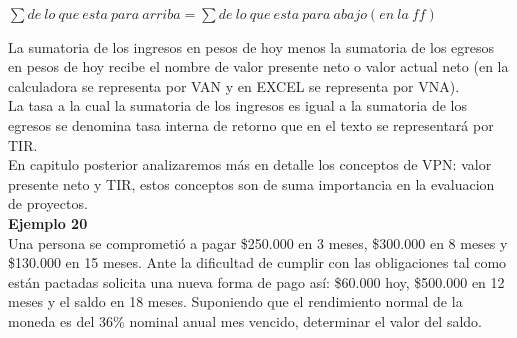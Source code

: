 \begin{center}
	$\sum de\ lo\ que\ esta\ para\ arriba = \sum de\ lo\ que\ esta\ para\ abajo(en\ la\ ff)$\\
\end{center}

La sumatoria de los ingresos en pesos de hoy menos la sumatoria de los egresos en pesos de hoy recibe el nombre de valor presente neto o valor actual neto (en la calculadora se representa por VAN y en EXCEL se representa por VNA).\\

La tasa a la cual la sumatoria de los ingresos es igual a la sumatoria de los egresos se denomina tasa interna de retorno que en el texto se representará por TIR.\\

En capitulo posterior analizaremos más en detalle los conceptos de VPN: valor presente neto y TIR, estos conceptos son de suma importancia en la evaluacion de proyectos.\\

\textbf{Ejemplo 20}\\

Una persona se comprometió a pagar \$250.000 en 3 meses, \$300.000 en 8 meses y \$130.000 en 15 meses. Ante la dificultad de cumplir con las obligaciones tal como están pactadas solicita una nueva forma de pago así: \$60.000 hoy, \$500.000 en 12 meses y el saldo en 18 meses. Suponiendo que el rendimiento normal de la moneda es del 36\% nominal anual mes vencido, determinar el valor del saldo.\\

